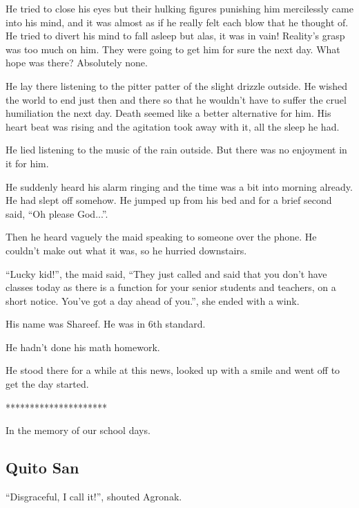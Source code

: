 \documentclass[twoside,11pt]{article}
\begin{document}
He tried to close his eyes but their hulking figures punishing him mercilessly came into his mind, and it was almost as if he really felt each blow that he thought of. He tried to divert his mind to fall asleep but alas, it was in vain! Reality's grasp was too much on him. They were going to get him for sure the next day. What hope was there? Absolutely none.

He lay there listening to the pitter patter of the slight drizzle outside. He wished the world to end just then and there so that he wouldn't have to suffer the cruel humiliation the next day. Death seemed like a better alternative for him. His heart beat was rising and the agitation took away with it, all the sleep he had.

He lied listening to the music of the rain outside. But there was no enjoyment in it for him.

He suddenly heard his alarm ringing and the time was a bit into morning already. He had slept off somehow. He jumped up from his bed and for a brief second said, ``Oh please God...''.

Then he heard vaguely the maid speaking to someone over the phone. He couldn't make out what it was, so he hurried downstairs.

``Lucky kid!'', the maid said, ``They just called and said that you don't have classes today as there is a function for your senior students and teachers, on a short notice. You've got a day ahead of you.'', she ended with a wink.

His name was Shareef. He was in 6th standard.

He hadn't done his math homework.

He stood there for a while at this news, looked up with a smile and went off to get the day started.

\bigskip
\begin{center}
*********************
\end{center}

In the memory of our school days.

\newpage

\begin{center}
  \section{Quito San}
\end{center}
\bigskip
\bigskip
\bigskip

``Disgraceful, I call it!'', shouted Agronak.
\end{document}
